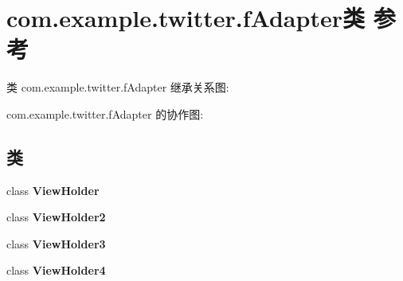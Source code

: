 \hypertarget{classcom_1_1example_1_1twitter_1_1f_adapter}{}\section{com.\+example.\+twitter.\+f\+Adapter类 参考}
\label{classcom_1_1example_1_1twitter_1_1f_adapter}


类 com.\+example.\+twitter.\+f\+Adapter 继承关系图\+:


com.\+example.\+twitter.\+f\+Adapter 的协作图\+:
\subsection*{类}
\begin{DoxyCompactItemize}
\item 
class {\bfseries View\+Holder}
\item 
class {\bfseries View\+Holder2}
\item 
class {\bfseries View\+Holder3}
\item 
class {\bfseries View\+Holder4}
\end{DoxyCompactItemize}
